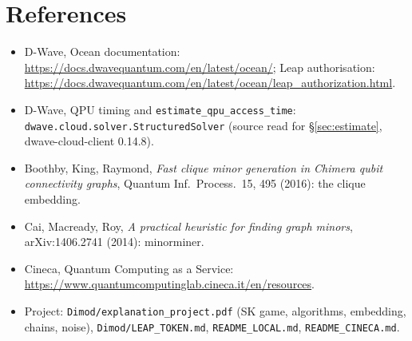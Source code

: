 \documentclass[11pt,a4paper]{article}
\newcommand{\code}[1]{\nolinkurl{#1}}
\begin{document}
\section*{References}
\begin{itemize}
\item D-Wave, Ocean documentation: \url{https://docs.dwavequantum.com/en/latest/ocean/}; Leap authorisation: \url{https://docs.dwavequantum.com/en/latest/ocean/leap_authorization.html}.
\item D-Wave, QPU timing and \code{estimate_qpu_access_time}: \code{dwave.cloud.solver.StructuredSolver} (source read for \S\ref{sec:estimate}, dwave-cloud-client 0.14.8).
\item Boothby, King, Raymond, \emph{Fast clique minor generation in Chimera qubit connectivity graphs}, Quantum Inf.\ Process.\ 15, 495 (2016): the clique embedding.
\item Cai, Macready, Roy, \emph{A practical heuristic for finding graph minors}, arXiv:1406.2741 (2014): minorminer.
\item Cineca, Quantum Computing as a Service: \url{https://www.quantumcomputinglab.cineca.it/en/resources}.
\item Project: \code{Dimod/explanation_project.pdf} (SK game, algorithms, embedding, chains, noise), \code{Dimod/LEAP_TOKEN.md}, \code{README_LOCAL.md}, \code{README_CINECA.md}.
\end{itemize}
\end{document}

